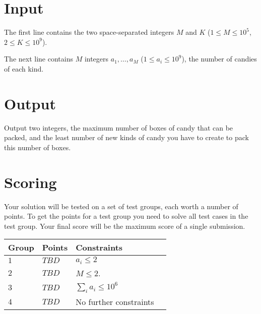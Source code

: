 \section*{Input}
The first line contains the two space-separated integers $M$ and $K$ ($1 \le M \le 10^5$, $2 \le K \le 10^9$).

The next line contains $M$ integers $a_1, \dots, a_M$ ($1 \le a_i \le 10^9$), the number of candies of each kind.

\section*{Output}
Output two integers, the maximum number of boxes of candy that can be packed, and the least number of new kinds of candy you have to create to pack this number of boxes.

\section*{Scoring}
Your solution will be tested on a set of test groups, each worth a number of points.
To get the points for a test group you need to solve all test cases in the test group.
Your final score will be the maximum score of a single submission.

\noindent
\begin{tabular}{| l | l | l | l |}
  \hline
  Group & Points & Constraints \\ \hline
  $1$    & $TBD$         & $a_i \le 2$ \\ \hline
  $2$    & $TBD$         & $M \le 2$. \\ \hline
  $3$    & $TBD$         & $\sum_i{a_i} \le 10^6$\\ \hline
  $4$    & $TBD$         & No further constraints\\ \hline
\end{tabular}
